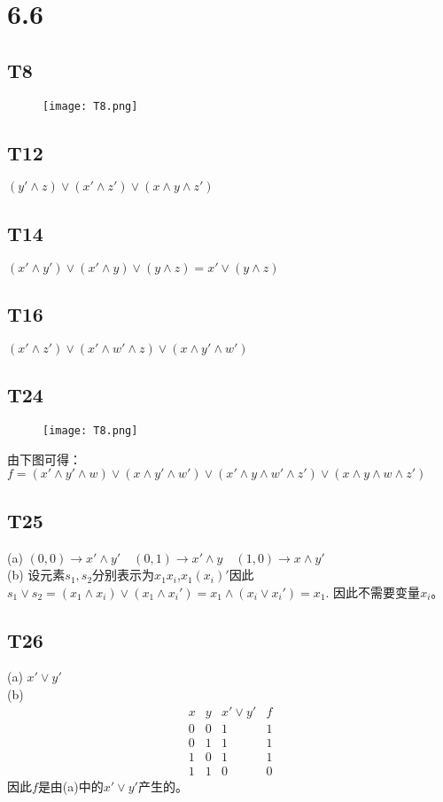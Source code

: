 \documentclass{article}
\begin{document}
\section{6.6}
\subsection{T8}
\begin{figure}[h]
    \centering
    \texttt{[image: T8.png]}
\end{figure}
\subsection{T12}
$(y' \land z) \lor (x' \land z') \lor (x \land y \land z')$
\subsection{T14}
$(x' \land y') \lor (x' \land y) \lor (y \land z) = x' \lor (y \land z)$
\subsection{T16}
$(x' \land z') \lor (x' \land w' \land z) \lor (x \land y' \land w')$
\subsection{T24}
\begin{figure}[h]
    \centering
    \texttt{[image: T8.png]}
\end{figure}
由下图可得：$f = (x' \land y' \land w) \lor (x \land y' \land w') \lor (x' \land y \land w' \land z') \lor (x \land y \land w \land z')$
\subsection{T25}
(a) $(0, 0) \rightarrow x' \land y' \quad (0, 1) \rightarrow x' \land y \quad (1, 0) \rightarrow x \land y'$\\
(b) 设元素$s_1, s_2$分别表示为$x_1x_i$,\quad$x_1(x_i)'$因此$s_1 \lor s_2 = (x_1 \land x_i) \lor (x_1 \land x_i') = x_1 \land (x_i \lor x_i') = x_1$.
因此不需要变量$x_i$。
\subsection{T26}
(a) $x' \lor y'$\\
(b) 
$$
\begin{array}{|c|c|c|c|}
    x & y & x' \lor y' & f\\
    \hline
    0 & 0 & 1 & 1\\
    0 & 1 & 1 & 1\\
    1 & 0 & 1 & 1\\
    1 & 1 & 0 & 0
\end{array}
$$
因此$f$是由(a)中的$x' \lor y'$产生的。
\end{document}
